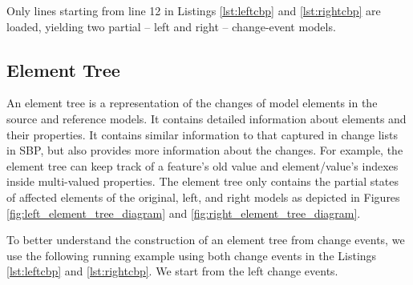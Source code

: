 \documentclass{jot}
\begin{document}
    Only lines starting from line 12 in Listings \ref{lst:leftcbp} and \ref{lst:rightcbp} are loaded, yielding two partial -- left and right -- change-event models. 
    
   
    \subsection{Element Tree}
    \label{sec:tree_construction}
    An element tree is a representation of the changes of model elements in the source and reference models. It contains detailed information about elements and their properties. It contains similar information to that captured in change lists in SBP, but also provides more information about the changes. For example, the element tree can keep track of a feature's old value and element/value's indexes inside multi-valued properties. The element tree only contains the partial states of affected elements of the original, left, and right models as depicted in Figures \ref{fig:left_element_tree_diagram} and \ref{fig:right_element_tree_diagram}.
    
    To better understand the construction of an element tree from change events, we use the following running example using both change events in the Listings \ref{lst:leftcbp} and \ref{lst:rightcbp}. We start from the left change events. 
    
\end{document}
